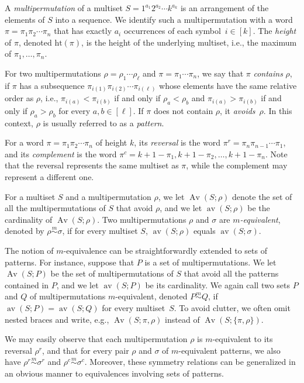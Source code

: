 \documentclass[11pt]{amsart}
\theoremstyle{plain}
\theoremstyle{definition}
\newcommand{\msim}{\stackrel{m}{\sim}}
\newcommand{\he}{\text{ht}}
\DeclareMathOperator{\Av}{Av}
\DeclareMathOperator{\av}{av}
\begin{document}
A \emph{multipermutation} of a multiset $S=1^{a_1}2^{a_2}\cdots k^{a_k}$ is an arrangement of the
elements of $S$ into a sequence. We identify such a multipermutation with a word
$\pi=\pi_1\pi_2\dotsb\pi_n$ that has exactly $a_i$ occurrences of each symbol~$i\in[k]$. The
\emph{height} of $\pi$, denoted $\he(\pi)$, is the height of the
underlying multiset, i.e., the maximum of $\pi_1,\dotsc,\pi_n$.

For two
multipermutations $\rho=\rho_1\dotsb\rho_\ell$ and $\pi=\pi_1\dotsb\pi_n$, we say that $\pi$
\emph{contains} $\rho$, if $\pi$ has a subsequence $\pi_{i(1)}\pi_{i(2)}\dotsb\pi_{i(\ell)}$ whose
elements have the same relative order as $\rho$, i.e., $\pi_{i(a)}<\pi_{i(b)}$ if and only if
$\rho_a<\rho_b$ and $\pi_{i(a)}>\pi_{i(b)}$ if and only if
$\rho_a>\rho_b$ for every $a,b\in[\ell]$. If $\pi$ does not contain $\rho$, it \emph{avoids}~$\rho$.
In this context, $\rho$ is usually referred to as a \emph{pattern}.

For a word $\pi=\pi_1\pi_2\dotsb\pi_n$ of height $k$, its \emph{reversal} is the word
$\pi^r=\pi_n\pi_{n-1}\dotsb\pi_1$, and its \emph{complement} is the word
$\pi^c=k+1-\pi_1,k+1-\pi_2,\dotsc, k+1-\pi_n$. Note that the reversal represents the same multiset as
$\pi$, while the complement may represent a different one.

For a multiset $S$ and a multipermutation $\rho$, we let $\Av(S;\rho)$ denote the set of all the
multipermutations of $S$ that avoid $\rho$, and we let $\av(S;\rho)$ be the cardinality of
$\Av(S;\rho)$. Two multipermutations $\rho$ and $\sigma$ are \emph{$m$-equivalent}, denoted by $\rho
\msim \sigma$, if for every multiset $S$, $\av(S; \rho)$ equals $\av(S;\sigma)$.

The notion of $m$-equivalence can be straightforwardly extended to sets of patterns. For instance,
suppose that $P$ is a set of multipermutations. We let $\Av(S;P)$ be the set of multipermutations
of $S$ that avoid all the patterns contained in $P$, and we let $\av(S;P)$ be its cardinality. We
again call two sets $P$ and $Q$ of multipermutations $m$-equivalent, denoted $P\msim Q$, if
$\av(S;P)=\av(S;Q)$ for every multiset~$S$. To avoid clutter, we often omit nested braces and write,
e.g., $\Av(S;\pi,\rho)$ instead of $\Av(S;\{\pi,\rho\})$.

We may easily observe that each multipermutation $\rho$ is $m$-equivalent to its reversal $\rho^r$,
and that for every pair $\rho$ and $\sigma$ of $m$-equivalent patterns, we also have
$\rho^r\msim\sigma^r$ and $\rho^c\msim\sigma^c$. Moreover, these symmetry relations can be
generalized in an obvious manner to equivalences involving sets of patterns.
\end{document}
